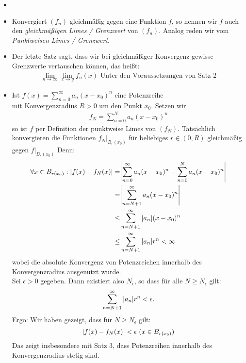 \begin{Bemerkung}{
	\begin{itemize}
		\item[ ]
		\item Konvergiert $(f_n)$ gleichmäßig gegen eine Funktion $f$, 
		so nennen wir $f$ auch den \emph{gleichmäßigen Limes / Grenzwert} 
		von $(f_n)$. Analog reden wir vom \emph{Punktweisen Limes / Grenzwert}.
		\item Der letzte Satz sagt, dass wir bei gleichmäßiger Konvergenz gewisse 
		Grenzwerte vertauschen können, das heißt:
		\begin{align*}
			\lim\limits_{n\rightarrow \infty}{\lim\limits_{x \rightarrow y}{f_n(x)}}
			\text{ Unter den Voraussetzungen von Satz 2}
		\end{align*}
		\item Ist $f(x) = \sum_{n = 0}^{\infty} a_n (x-x_0)^n$ eine Potenzreihe \\
		mit Konvergenzradius $R > 0$ um den Punkt $x_0$. Setzen wir 
		\begin{align*}
			f_N = \sum_{n = 0}^N a_n (x-x_0)^n
		\end{align*}
		so ist $f$ per Definition der punktweise Limes von $(f_N)$.
		Tatsächlich konvergieren die Funktionen $f_N\vert_{B_r(x_0)}$ für 
		beliebiges $r \in (0,R)$ gleichmäßig gegen $f\vert_{B_r(x_0)}$ 
		Denn:
		\begin{align*}
			\forall x \in B_{r (x_0)} : \abs{f(x)- f_N(x) } 
			=&\abs{ \sum_{n=0}^{\infty} a_n (x-x_0)^n - \sum_{n=0}^N a_n (x-x_0)^n} \\
			= & \abs{\sum_{n = N+1 }^{\infty} a_n (x-x_0)^n} \\
			\leq & \sum_{n = N+1}^{\infty} \abs{a_n}(x-x_0)^n \\
			\leq & \sum_{n = N +1}^{\infty} \abs{a_n} r^n < \infty
		\end{align*}
		wobei die absolute Konvergenz von Potenzreichen innerhalb des 
		Konvergenzradius ausgenutzt wurde. \\
		Sei $\epsilon > 0$ gegeben. Dann existiert also $N_{\epsilon}$, so dass 
		für alle $N \geq N_{\epsilon}$ gilt:
		\begin{align*}
			\sum_{n = N+1}^{\infty}\abs{a_n}r^n < \epsilon.
		\end{align*}
		Ergo: Wir haben gezeigt, dass für $N \geq N_{\epsilon}$ gilt:
		\begin{align*}
			\abs{f(x) - f_N(x)} < \epsilon \text{ } (x \in B_{r(x_0)})
		\end{align*}
		Das zeigt insbesondere mit Satz 3,  %
		 dass Potenzreihen innerhalb des Konvergenzradius stetig sind.
	\end{itemize}
}\end{Bemerkung}

